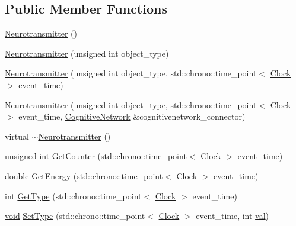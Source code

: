 \subsection*{Public Member Functions}
\begin{DoxyCompactItemize}
\item 
\mbox{\hyperlink{class_neurotransmitter_a05883c62f2c20b8034121a46c50de00f}{Neurotransmitter}} ()
\item 
\mbox{\hyperlink{class_neurotransmitter_adca6f02b1a9c98d269e3909e1e2f0463}{Neurotransmitter}} (unsigned int object\+\_\+type)
\item 
\mbox{\hyperlink{class_neurotransmitter_ac1c768a2769536a8a16569ae0dde1671}{Neurotransmitter}} (unsigned int object\+\_\+type, std\+::chrono\+::time\+\_\+point$<$ \mbox{\hyperlink{universe_8h_a0ef8d951d1ca5ab3cfaf7ab4c7a6fd80}{Clock}} $>$ event\+\_\+time)
\item 
\mbox{\hyperlink{class_neurotransmitter_ac9257a1b310a26eba8a08ffb4b93bb64}{Neurotransmitter}} (unsigned int object\+\_\+type, std\+::chrono\+::time\+\_\+point$<$ \mbox{\hyperlink{universe_8h_a0ef8d951d1ca5ab3cfaf7ab4c7a6fd80}{Clock}} $>$ event\+\_\+time, \mbox{\hyperlink{class_cognitive_network}{Cognitive\+Network}} \&cognitivenetwork\+\_\+connector)
\item 
virtual \mbox{\hyperlink{class_neurotransmitter_a0ea63f67dc5a49d485b7a7034a8f7968}{$\sim$\+Neurotransmitter}} ()
\item 
unsigned int \mbox{\hyperlink{class_neurotransmitter_a94b3d1909cdd787f0583e28e1e9b58dd}{Get\+Counter}} (std\+::chrono\+::time\+\_\+point$<$ \mbox{\hyperlink{universe_8h_a0ef8d951d1ca5ab3cfaf7ab4c7a6fd80}{Clock}} $>$ event\+\_\+time)
\item 
double \mbox{\hyperlink{class_neurotransmitter_a1e3e8134ea935f617b0afd2f7b5b5799}{Get\+Energy}} (std\+::chrono\+::time\+\_\+point$<$ \mbox{\hyperlink{universe_8h_a0ef8d951d1ca5ab3cfaf7ab4c7a6fd80}{Clock}} $>$ event\+\_\+time)
\item 
int \mbox{\hyperlink{class_neurotransmitter_a45414c0d173758edbbf9318a7eccb623}{Get\+Type}} (std\+::chrono\+::time\+\_\+point$<$ \mbox{\hyperlink{universe_8h_a0ef8d951d1ca5ab3cfaf7ab4c7a6fd80}{Clock}} $>$ event\+\_\+time)
\item 
\mbox{\hyperlink{glad_8h_a950fc91edb4504f62f1c577bf4727c29}{void}} \mbox{\hyperlink{class_neurotransmitter_ae460ed5fac92ba136a80bba12ebce246}{Set\+Type}} (std\+::chrono\+::time\+\_\+point$<$ \mbox{\hyperlink{universe_8h_a0ef8d951d1ca5ab3cfaf7ab4c7a6fd80}{Clock}} $>$ event\+\_\+time, int \mbox{\hyperlink{glad_8h_a26942fd2ed566ef553eae82d2c109c8f}{val}})

\end{DoxyCompactItemize}

